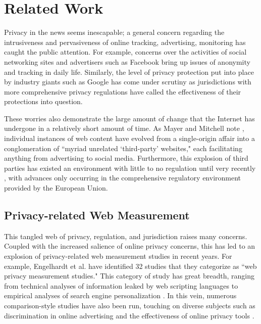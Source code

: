 \documentclass[12pt,draft,onecolumn]{IEEEtran}
\begin{document}
\section{Related Work}
Privacy in the news seems inescapable; a general concern regarding the intrusiveness and pervasiveness of online tracking, advertising, monitoring has caught the public attention. For example, concerns over the activities of social networking sites and advertisers such as Facebook \cite{wsj_fb} bring up issues of anonymity and tracking in daily life. Similarly, the level of privacy protection put into place by industry giants such as Google has come under scrutiny \cite{Google_EU_marketingland} as jurisdictions with more comprehensive privacy regulations have called the effectiveness of their protections into question.

These worries also demonstrate the large amount of change that the Internet has undergone in a relatively short amount of time. As Mayer and Mitchell note \cite{Mayer_Mitchell}, individual instances of web content have evolved from a single-origin affair into a conglomeration of  ``myriad unrelated  `third-party' websites," each facilitating anything from advertising to social media. Furthermore, this explosion of third parties has existed an environment with little to no regulation until very recently \cite{Mayer_Mitchell}, with advances only occurring in the comprehensive regulatory environment provided by the European Union.  

\subsection{Privacy-related Web Measurement}
This tangled web of privacy, regulation, and jurisdiction raises many concerns. Coupled with the increased salience of online privacy concerns, this has led to an explosion of privacy-related web measurement studies in recent years. For example, Engelhardt et al. \cite{openwpm_article} have identified 32 studies that they categorize as ``web privacy measurement studies." This category of study has great breadth, ranging from technical analyses of information leaked by web scripting languages \cite{jang} to empirical analyses of search engine personalization \cite{hannak}.  In this vein, numerous comparison-style studies have also been run, touching on diverse subjects such as discrimination in online advertising \cite{sweeney} and the effectiveness of online privacy tools \cite{balebako}.
\end{document}
